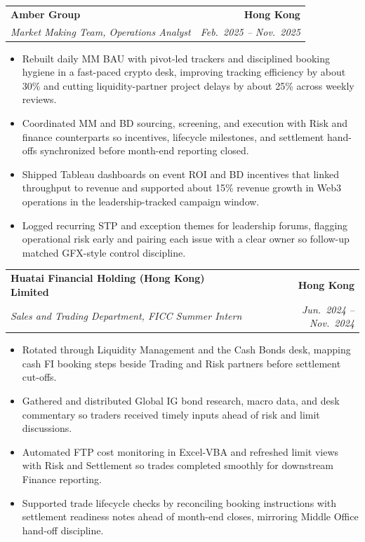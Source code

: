 \documentclass[9pt,a4paper]{extarticle}
\makeatletter
\newcommand{\resumeSubheading}[4]{%
  \vspace{0.6em}%
  \begin{tabular*}{\textwidth}{l@{\extracolsep{\fill}}r}
    \textbf{#1} & \textbf{#2} \\
    \textit{\small #3} & \textit{\small #4} \\
  \end{tabular*}\vspace{0.32em}}
\makeatother
\begin{document}
\resumeSubheading{Amber Group}{Hong Kong}{Market Making Team, Operations Analyst}{Feb.\ 2025 -- Nov.\ 2025}
\begin{itemize}
  \item Rebuilt daily MM BAU with pivot-led trackers and disciplined booking hygiene in a fast-paced crypto desk, improving tracking efficiency by about 30\% and cutting liquidity-partner project delays by about 25\% across weekly reviews.
  \item Coordinated MM and BD sourcing, screening, and execution with Risk and finance counterparts so incentives, lifecycle milestones, and settlement hand-offs synchronized before month-end reporting closed.
  \item Shipped Tableau dashboards on event ROI and BD incentives that linked throughput to revenue and supported about 15\% revenue growth in Web3 operations in the leadership-tracked campaign window.
  \item Logged recurring STP and exception themes for leadership forums, flagging operational risk early and pairing each issue with a clear owner so follow-up matched GFX-style control discipline.
\end{itemize}

\resumeSubheading{Huatai Financial Holding (Hong Kong) Limited}{Hong Kong}{Sales and Trading Department, FICC Summer Intern}{Jun.\ 2024 -- Nov.\ 2024}
\begin{itemize}
  \item Rotated through Liquidity Management and the Cash Bonds desk, mapping cash FI booking steps beside Trading and Risk partners before settlement cut-offs.
  \item Gathered and distributed Global IG bond research, macro data, and desk commentary so traders received timely inputs ahead of risk and limit discussions.
  \item Automated FTP cost monitoring in Excel-VBA and refreshed limit views with Risk and Settlement so trades completed smoothly for downstream Finance reporting.
  \item Supported trade lifecycle checks by reconciling booking instructions with settlement readiness notes ahead of month-end closes, mirroring Middle Office hand-off discipline.
\end{itemize}
\end{document}
